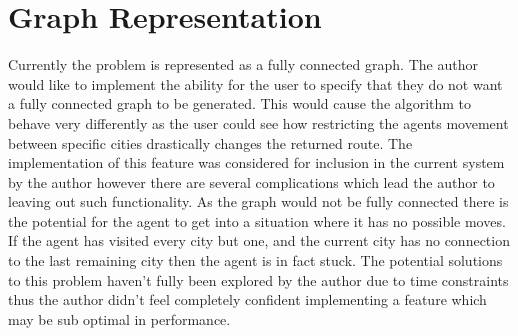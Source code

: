 \section{Graph Representation}

Currently the problem is represented as a fully connected graph. The author would like to implement the ability for the user to specify that they do not want a fully connected graph to be generated. This would cause the algorithm to behave very differently as the user could see how restricting the agents movement between specific cities drastically changes the returned route. The implementation of this feature was considered for inclusion in the current system by the author however there are several complications which lead the author to leaving out such functionality. As the graph would not be fully connected there is the potential for the agent to get into a situation where it has no possible moves. If the agent has visited every city but one, and the current city has no connection to the last remaining city then the agent is in fact stuck. The potential solutions to this problem haven’t fully been explored by the author due to time constraints thus the author didn’t feel completely confident implementing a feature which may be sub optimal in performance.

